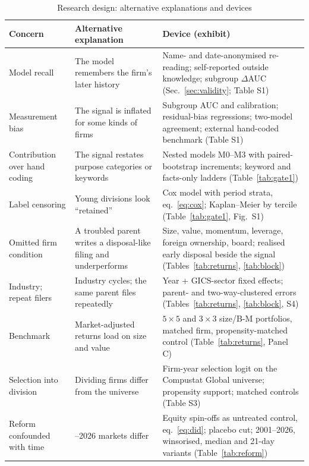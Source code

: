 \begin{table}[htbp]
\centering
\caption{Research design: alternative explanations and devices}\label{tab:design}
{\scriptsize\singlespacing\setlength{\tabcolsep}{4pt}
\begin{tabular}{>{\raggedright\arraybackslash}p{3.0cm}>{\raggedright\arraybackslash}p{5.4cm}>{\raggedright\arraybackslash}p{6.3cm}}
\toprule
Concern & Alternative explanation & Device (exhibit) \\
\midrule
Model recall & The model remembers the firm's later history & Name- and date-anonymised re-reading; self-reported outside knowledge; subgroup $\Delta$AUC (Sec.~\ref{sec:validity}; Table S1) \\
Measurement bias & The signal is inflated for some kinds of firms & Subgroup AUC and calibration; residual-bias regressions; two-model agreement; external hand-coded benchmark (Table S1) \\
Contribution over hand coding & The signal restates purpose categories or keywords & Nested models M0--M3 with paired-bootstrap increments; keyword and facts-only ladders (Table~\ref{tab:gate1}) \\
Label censoring & Young divisions look ``retained'' & Cox model with period strata, eq.~\eqref{eq:cox}; Kaplan--Meier by tercile (Table~\ref{tab:gate1}, Fig.~S1) \\
Omitted firm condition & A troubled parent writes a disposal-like filing and underperforms & Size, value, momentum, leverage, foreign ownership, board; realised early disposal beside the signal (Tables~\ref{tab:returns}, \ref{tab:block}) \\
Industry; repeat filers & Industry cycles; the same parent files repeatedly & Year + GICS-sector fixed effects; parent- and two-way-clustered errors (Tables~\ref{tab:returns}, \ref{tab:block}, S4) \\
Benchmark & Market-adjusted returns load on size and value & $5\times5$ and $3\times3$ size/B-M portfolios, matched firm, propensity-matched control (Table~\ref{tab:returns}, Panel C) \\
Selection into division & Dividing firms differ from the universe & Firm-year selection logit on the Compustat Global universe; propensity support; matched controls (Table S3) \\
Reform confounded with time & 2023--2026 markets differ & Equity spin-offs as untreated control, eq.~\eqref{eq:did}; placebo cut; 2001--2026, winsorised, median and 21-day variants (Table~\ref{tab:reform}) \\

\end{tabular}}
\end{table}

